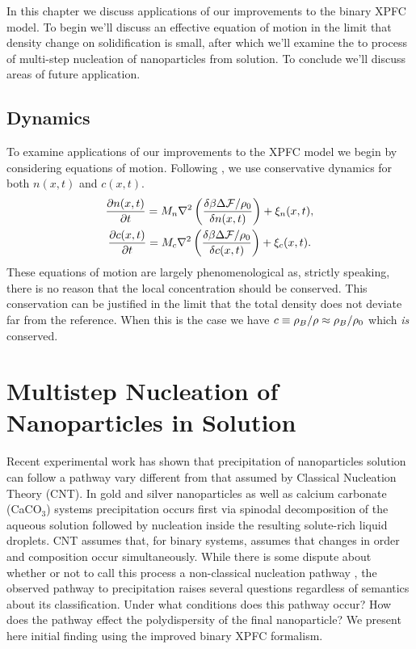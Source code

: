 \label{chapter:applications}

In this chapter we discuss applications of our improvements to the binary XPFC
model.  To begin we'll discuss an effective equation of motion in the limit
that density change on solidification is small, after which we'll examine the
to process of multi-step nucleation of nanoparticles from solution. To conclude
we'll discuss areas of future application.

\subsection{Dynamics} %

To examine applications of our improvements to the XPFC model we begin by
considering equations of motion. Following \cite{GREENWOOD11_BINARY}, we use
conservative dynamics for both $n(x, t)$ and $c(x, t)$.
%
\begin{gather}
    \frac{\partial n(x, t)}{\partial t} = 
        M_n \nabla^2\left(\frac{\delta \beta \Delta\mathcal{F} / \rho_0}{\delta n(x, t)}\right) 
        + \xi_n(x, t), \\ 
    \frac{\partial c(x, t)}{\partial t} = 
        M_c \nabla^2\left(\frac{\delta \beta \Delta \mathcal{F} / \rho_0}{\delta c(x, t)}\right)
        + \xi_c(x, t).
\end{gather}
%
These equations of motion are largely phenomenological as, strictly speaking,
there is no reason that the local concentration should be conserved.  This
conservation can be justified in the limit that the total density does not
deviate far from the reference. When this is the case we have $c \equiv \rho_B /
\rho \approx \rho_B / \rho_0$ which \textit{is} conserved.

\section{Multistep Nucleation of Nanoparticles in Solution} %

Recent experimental work has shown that precipitation of nanoparticles solution
can follow a pathway vary different from that assumed by Classical Nucleation
Theory (CNT).  In gold and silver nanoparticles\cite{LOH17} as well as calcium
carbonate (CaCO${}_3$)\cite{WALLACE13} systems precipitation occurs first via
spinodal decomposition of the aqueous solution followed by nucleation inside
the resulting solute-rich liquid droplets. CNT assumes that, for binary
systems, assumes that changes in order and composition occur simultaneously.
While there is some dispute about whether or not to call this process a
non-classical nucleation pathway \cite{DAVEY13, GEBAUER11}, the observed pathway
to precipitation raises several questions regardless of semantics about its
classification. Under what conditions does this pathway occur? How does the 
pathway effect the polydispersity of the final nanoparticle? We present here
initial finding using the improved binary XPFC formalism.

